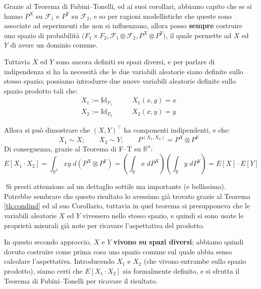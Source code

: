 \noindent Grazie al Teorema di Fubini--Tonelli, ed ai suoi corollari, abbiamo capito che se si hanno $P^X$ su $\mathcal{F}_1$ e $P^Y$ su $\mathcal{F}_2$, e so per ragioni modellistiche che queste sono associate ad esperimenti che non si influenzano, allora posso \textbf{sempre} costruire uno spazio di probabilità $\bigl(F_1\times F_2, \mathcal{F}_1\otimes\mathcal{F}_2, P^X\otimes P^Y\bigr)$, il quale permette ad $X$ ed $Y$ di avere un dominio comune.

\medskip 
Tuttavia $X$ ed $Y$ sono ancora definiti su spazi diversi, e per parlare di indipendenza si ha la necessità che le due variabili aleatorie siano definite sullo stesso spazio; possiamo introdurre due nuove variabili aleatorie definite sullo spazio prodotto tali che:
\begin{align*}
    X_1 :=\text{Id}_{F_1}\qquad &X_1(x, y) = x\\
    X_2 :=\text{Id}_{F_2}\qquad &X_2(x, y) = y
\end{align*}

\noindent Allora si può dimostrare che $(X, Y)^\top$ ha componenti indipendenti, e che:
\[X_1\sim X;\qquad X_2\sim Y;\qquad P^{(X_1, X_2)} = P^X\otimes P^Y\]
Di conseguenza, grazie al Teorema di F--T su $\mathbb{R}^n$:
\[E[X_1\cdot X_2] = \int_{\mathbb{R}^2} xy\;d(P^X\otimes P^Y) = \left(\int _\mathbb{R}x\;dP^X\right)\left(\int _\mathbb{R}y\;dP^Y\right) = E[X]\cdot E[Y]\]

\noindent \faWarning $\;$Si presti attenzione ad un dettaglio sottile ma importante (e bellissimo). Potrebbe sembrare che questo risultato lo avessimo già trovato grazie al Teorema \ref{th:condind} ed al suo Corollario, tuttavia in quel teorema si presupponeva che le variabili aleatorie $X$ ed $Y$ vivessero nello stesso spazio, e quindi si sono usate le proprietà misurali già note per ricavare l'aspettativa del prodotto.

\medskip
In questo secondo approccio, $X$ e $Y$ \textbf{vivono su spazi diversi}; abbiamo quindi dovuto costruire come prima cosa uno spazio comune sul quale abbia senso calcolare l'aspettativa. Introducendo $X_1$ e $X_2$ (che vivono entrambe sullo spazio prodotto), siamo certi che $E[X_1\cdot X_2]$ sia formalmente definito, e si sfrutta il Teorema di Fubini--Tonelli per ricavare il risultato. \faWarning

